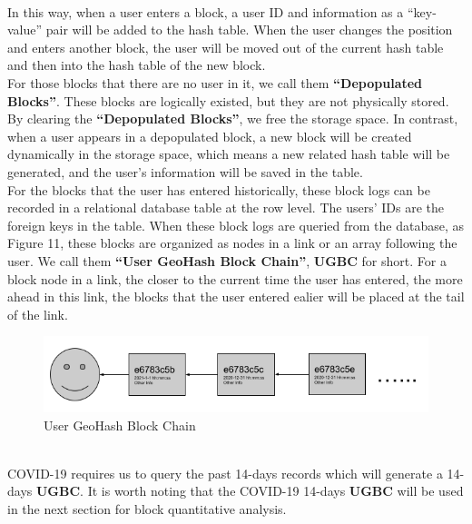 \documentclass[sigplan,screen]{acmart}
\begin{document}
\\
In this way, when a user enters a block, a user ID and information as a ``key-value'' pair will be added to the hash table.
When the user changes the position and enters another block, the user will be moved out of the current hash table and then into the hash table of the new block.
\\
For those blocks that there are no user in it, we call them \textbf{``Depopulated Blocks''}.
These blocks are logically existed, but they are not physically stored.
By clearing the \textbf{``Depopulated Blocks''}, we free the storage space.
In contrast, when a user appears in a depopulated block, a new block will be created dynamically in the storage space, which means a new related hash table will be generated, and the user's information will be saved in the table.
\\
For the blocks that the user has entered historically, these block logs can be recorded in a relational database table at the row level.
The users' IDs are the foreign keys in the table.
When these block logs are queried from the database, as Figure 11, these blocks are organized as nodes in a link or an array following the user.
We call them \textbf{``User GeoHash Block Chain''}, \textbf{UGBC} for short.
For a block node in a link, the closer to the current time the user has entered, the more ahead in this link, the blocks that the user entered ealier will be placed at the tail of the link.
\begin{figure}[htb]
	\centering\includegraphics[width=\linewidth]{block-log.png}
	\caption{User GeoHash Block Chain}
\end{figure}
\\
COVID-19 requires us to query the past 14-days records which will generate a 14-days \textbf{UGBC}.
It is worth noting that the COVID-19 14-days \textbf{UGBC} will be used in the next section for block quantitative analysis.
\end{document}
